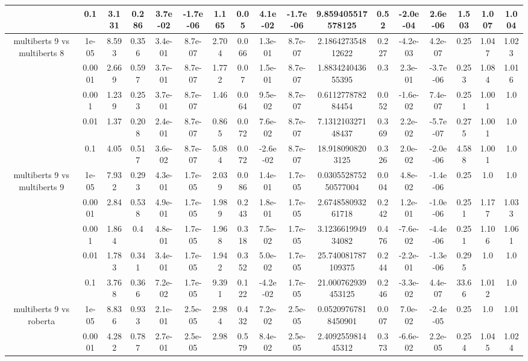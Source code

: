 \begin{tabular}{|c|c|c|c|c|c|c|c|c|c|c|c|c|c|c|c|c|}
 & 0.1 & 3.131 & 0.286 & 3.7e-02 & -1.7e-06 & 1.165 & 0.05 & 4.1e-02 & -1.7e-06 & 9.859405517578125 & 0.52 & -2.0e-04 & 2.6e-06 & 1.503 & 1.007 & 1.004 \\
\hline
\multirow{5}{*}{multiberts 9 vs multiberts 8} & 1e-05 & 8.593 & 0.356 & 3.4e-01 & 8.7e-07 & 2.704 & 0.066 & 1.3e-01 & 8.7e-07 & 2.186427354812622 & 0.227 & -4.2e-03 & 4.2e-07 & 0.25 & 1.047 & 1.023 \\
 & 0.0001 & 2.669 & 0.597 & 3.7e-01 & 8.7e-07 & 1.772 & 0.07 & 1.5e-01 & 8.7e-07 & 1.883424043655395 & 0.3 & 2.3e-01 & -3.7e-06 & 0.253 & 1.084 & 1.016 \\
 & 0.001 & 1.239 & 0.253 & 3.7e-01 & 8.7e-07 & 1.46 & 0.064 & 9.5e-02 & 8.7e-07 & 0.611277878284454 & 0.052 & -1.6e-02 & 7.4e-07 & 0.251 & 1.001 & 1.0 \\
 & 0.01 & 1.37 & 0.208 & 2.4e-01 & 8.7e-07 & 0.865 & 0.072 & 7.6e-02 & 8.7e-07 & 7.131210327148437 & 0.369 & 2.2e-02 & -5.7e-07 & 0.275 & 1.001 & 1.0 \\
 & 0.1 & 4.05 & 0.517 & 3.6e-02 & 8.7e-07 & 5.084 & 0.072 & -2.6e-02 & 8.7e-07 & 18.9180908203125 & 0.326 & 2.0e-02 & -2.0e-06 & 4.588 & 1.001 & 1.0 \\
\hline
\multirow{5}{*}{multiberts 9 vs multiberts 9} & 1e-05 & 7.932 & 0.293 & 4.3e-01 & 1.7e-05 & 2.039 & 0.086 & 1.4e-01 & 1.7e-05 & 0.030552875250577004 & 0.004 & 4.8e-02 & -1.4e-06 & 0.25 & 1.0 & 1.0 \\
 & 0.0001 & 2.84 & 0.538 & 4.9e-01 & 1.7e-05 & 1.989 & 0.243 & 1.8e-01 & 1.7e-05 & 2.674858093261718 & 0.242 & 1.2e-01 & -1.0e-06 & 0.251 & 1.177 & 1.033 \\
 & 0.001 & 1.864 & 0.4 & 4.8e-01 & 1.7e-05 & 1.968 & 0.318 & 7.5e-02 & 1.7e-05 & 3.123661994934082 & 0.476 & -7.6e-02 & -4.4e-06 & 0.251 & 1.106 & 1.061 \\
 & 0.01 & 1.783 & 0.341 & 3.4e-01 & 1.7e-05 & 1.942 & 0.352 & 5.0e-02 & 1.7e-05 & 25.740081787109375 & 0.244 & -2.2e-01 & -1.3e-06 & 0.295 & 1.0 & 1.0 \\
 & 0.1 & 3.768 & 0.366 & 7.2e-02 & 1.7e-05 & 9.391 & 0.122 & -4.2e-02 & 1.7e-05 & 21.000762939453125 & 0.246 & -3.3e-02 & 4.4e-07 & 33.66 & 1.012 & 1.0 \\
\hline
\multirow{5}{*}{multiberts 9 vs roberta } & 1e-05 & 8.836 & 0.933 & 2.1e-01 & 2.5e-05 & 2.984 & 0.432 & 7.2e-02 & 2.5e-05 & 0.05209767818450901 & 0.007 & 7.0e-02 & -2.4e-05 & 0.25 & 1.0 & 1.01 \\
 & 0.0001 & 4.282 & 0.787 & 2.7e-01 & 2.5e-05 & 2.98 & 0.579 & 8.4e-02 & 2.5e-05 & 2.409255981445312 & 0.373 & -6.6e-02 & 2.2e-05 & 0.254 & 1.045 & 1.024 \\

\end{tabular}
